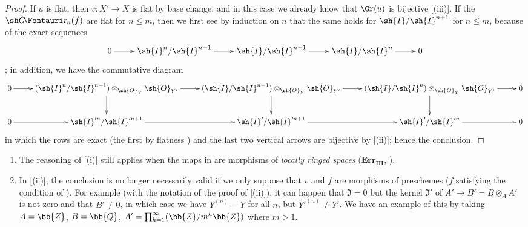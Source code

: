 \begin{proof}
If $u$ is flat, then $v:X'\to X$ is flat by base change, and in this case we already know that $\Gr(u)$ is bijective [(iii)].
If the $\shGr_n(f)$ are flat for $n\leq m$, then we first see by induction on $n$ that the same holds for $\sh{I}/\sh{I}^{n+1}$ for $n\leq m$, because of the exact sequences
  \[
    \xymatrix{
      0 \ar[r] & \sh{I}^n/\sh{I}^{n+1} \ar[r] & \sh{I}/\sh{I}^{n+1} \ar[r] & \sh{I}/\sh{I}^{n} \ar[r] & 0
    }
  \]
  ;
  in addition, we have the commutative diagram
  \[
    \xymatrix{
      0 \ar[r] & (\sh{I}^n/\sh{I}^{n+1}) \otimes_{\sh{O}_Y}\sh{O}_{Y'} \ar[d]\ar[r] &( \sh{I}/\sh{I}^{n+1}) \otimes_{\sh{O}_Y}\sh{O}_{Y'} \ar[d]\ar[r] & (\sh{I}/\sh{I}^{n}) \otimes_{\sh{O}_Y}\sh{O}_{Y'} \ar[d]\ar[r] & 0 \\
      0 \ar[r] & \sh{I}'^n/\sh{I}'^{n+1} \ar[r] & \sh{I}'/\sh{I}'^{n+1} \ar[r] & \sh{I}'/\sh{I}'^{n} \ar[r] & 0
    }
  \]
  in which the rows are exact (the first by flatness ) and the last two vertical arrows are bijective by [(ii)];
  hence the conclusion.
\end{proof}

\begin{remarks}[16.2.5]
\label{IV.16.2.5}
\medskip\noindent
\begin{enumerate}
  \item[(i)] The reasoning of [(i)] still applies when the maps in  are morphisms of \emph{locally ringed spaces} ($\mathbf{Err_{III}}$, ).
  \item[(ii)] In [(ii)], the conclusion is no longer necessarily valid if we only suppose that $v$ and $f$ are morphisms of preschemes ($f$ satisfying the condition of ).
  For example (with the notation of the proof of [(ii)]), it can happen that $\mathfrak{I} = 0$ but the kernel $\mathfrak{I}'$ of $A' \to B' = B \otimes_A A'$ is not zero and that $B' \neq 0$, in which case we have $Y^{(n)} = Y$ for all $n$, but ${Y'}^{(n)} \neq Y'$.
  We have an example of this by taking $A = \bb{Z}$, $B = \bb{Q}$, $A' = \prod_{h = 1}^\infty (\bb{Z}/m^h\bb{Z})$ where $m>1$.
\end{enumerate}
\end{remarks}

